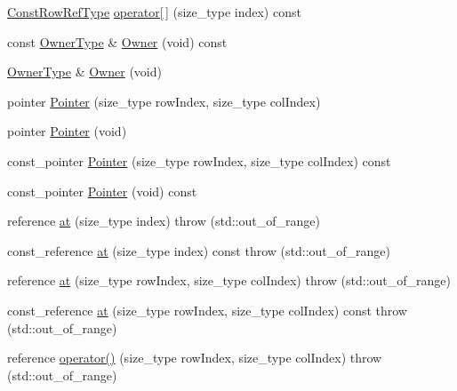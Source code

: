 \begin{DoxyCompactItemize}
\item 
\hyperlink{classvct_dynamic_const_matrix_base_a42a300cb1afd5f0602ba5c2d7d9cc40b}{Const\-Row\-Ref\-Type} \hyperlink{classvct_dynamic_matrix_base_a60b354a884612e88784b54711c24604a}{operator\mbox{[}$\,$\mbox{]}} (size\-\_\-type index) const 
\item 
const \hyperlink{classvct_dynamic_const_matrix_base_a2e37ebc2ac741d4346d21f986e625e96}{Owner\-Type} \& \hyperlink{classvct_dynamic_matrix_base_af1e62c6df98a585144c000628bc2712b}{Owner} (void) const 
\item 
\hyperlink{classvct_dynamic_const_matrix_base_a2e37ebc2ac741d4346d21f986e625e96}{Owner\-Type} \& \hyperlink{classvct_dynamic_matrix_base_ad17391454ad7a4188e1ed067dc1c6d46}{Owner} (void)
\item 
pointer \hyperlink{classvct_dynamic_matrix_base_a1640cc52014d5676f509d2f9e72f7803}{Pointer} (size\-\_\-type row\-Index, size\-\_\-type col\-Index)
\item 
pointer \hyperlink{classvct_dynamic_matrix_base_a631904190680ef5d6944cda3b5f86fa8}{Pointer} (void)
\item 
const\-\_\-pointer \hyperlink{classvct_dynamic_matrix_base_a72cb3bdb402b840ddd664a59b77033e3}{Pointer} (size\-\_\-type row\-Index, size\-\_\-type col\-Index) const 
\item 
const\-\_\-pointer \hyperlink{classvct_dynamic_matrix_base_afd1f6495ccd2c9c5557a3f941a7a552d}{Pointer} (void) const 
\item 
reference \hyperlink{classvct_dynamic_matrix_base_a51b8ffe675d3810b96ecc0820f3936e9}{at} (size\-\_\-type index)  throw (std\-::out\-\_\-of\-\_\-range)
\item 
const\-\_\-reference \hyperlink{classvct_dynamic_matrix_base_a84523d1dd74aa7dbbb3f4fa498f541ac}{at} (size\-\_\-type index) const   throw (std\-::out\-\_\-of\-\_\-range)
\item 
reference \hyperlink{classvct_dynamic_matrix_base_a7c4ba3b87d2aa03795285dd216c1f573}{at} (size\-\_\-type row\-Index, size\-\_\-type col\-Index)  throw (std\-::out\-\_\-of\-\_\-range)
\item 
const\-\_\-reference \hyperlink{classvct_dynamic_matrix_base_ae665610f77ec304ea0d9757a42926a49}{at} (size\-\_\-type row\-Index, size\-\_\-type col\-Index) const   throw (std\-::out\-\_\-of\-\_\-range)
\item 
reference \hyperlink{classvct_dynamic_matrix_base_a3862bb256a94ea9a61eadd16b24a4fc8}{operator()} (size\-\_\-type row\-Index, size\-\_\-type col\-Index)  throw (std\-::out\-\_\-of\-\_\-range)

\end{DoxyCompactItemize}
